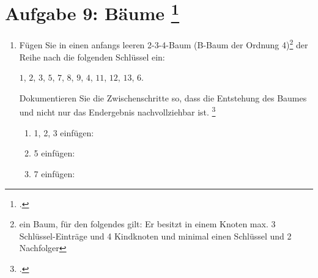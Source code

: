 \documentclass{lehramt-informatik-minimal}
\begin{document}
\section{Aufgabe 9: Bäume
\footcite[entnommen aus Algorithmen und
Datenstrukturen, Übungsblatt 6, Universität Würzburg]{aud:pu:7}}

\begin{enumerate}


\item Fügen Sie in einen anfangs leeren 2-3-4-Baum (B-Baum der Ordnung
4)\footnote{ein Baum, für den folgendes gilt: Er besitzt in einem Knoten
max. 3 Schlüssel-Einträge und 4 Kindknoten und minimal einen Schlüssel
und 2 Nachfolger} der Reihe nach die folgenden Schlüssel ein:

\centerline{$1$, $2$, $3$, $5$, $7$, $8$, $9$, $4$, $11$, $12$, $13$, $6$.}

Dokumentieren Sie die Zwischenschritte so,
dass die Entstehung des Baumes und nicht nur das Endergebnis
nachvollziehbar ist. \footcite[Staatsexamen Theoretische Informatik,
Algorithmen und Datenstrukturen, Realschulen, Frühjahr 2011, Thema 1
Aufgabe 3]{examen:46115:2011:03}

\begin{antwort}
\begin{multicols}{2}
\begin{enumerate}

%

\item 1, 2, 3 einfügen:


%

\item 5 einfügen:


%

\item 7 einfügen:


\end{enumerate}
\end{multicols}
\end{antwort}
\end{enumerate}
\end{document}
